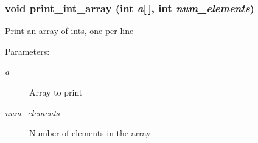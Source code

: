 \subsubsection{\setlength{\rightskip}{0pt plus 5cm}void print\_\-int\_\-array (int {\em a}[$\,$], int {\em num\_\-elements})}\label{print__arrays_8c_56fe614d6cfded99e4e9704f9f86ae22}


Print an array of ints, one per line \begin{Desc}
\item[Parameters:]
\begin{description}
\item[{\em a}]Array to print \item[{\em num\_\-elements}]Number of elements in the array \end{description}
\end{Desc}
